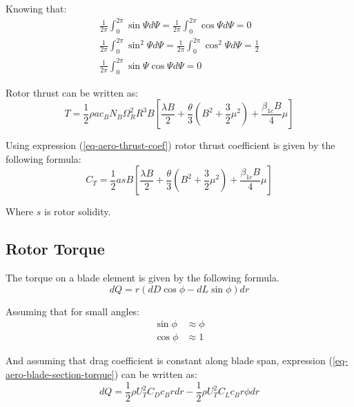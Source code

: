 Knowing that: \cite{GessowMyers1985}
\begin{gather}
  \frac{1}{2\pi} \int_{0}^{2\pi} \sin \Psi d\Psi =
  \frac{1}{2\pi} \int_{0}^{2\pi} \cos \Psi d\Psi = 0 \\
  \frac{1}{2\pi} \int_{0}^{2\pi} \sin^2 \Psi d\Psi =
  \frac{1}{2\pi} \int_{0}^{2\pi} \cos^2 \Psi d\Psi = \frac{1}{2} \\
  \frac{1}{2\pi} \int_{0}^{2\pi} \sin \Psi \cos \Psi d\Psi = 0
\end{gather}

Rotor thrust can be written as:
\begin{equation}
  T = \frac{1}{2} \rho a c_B N_B \Omega_R^2 R^3 B
  \left[
    \frac{\lambda B}{2} 
    +
    \frac{\theta}{3} \left( B^2 + \frac{3}{2} \mu^2 \right)
    +
    \frac{\beta_{1c} B}{4} \mu
  \right]
\end{equation}

Using expression (\ref{eq-aero-thrust-coef}) rotor thrust coefficient is given by the following formula:
\begin{equation}
  C_T = \frac{1}{2} a s B
  \left[
    \frac{\lambda B}{2}
    +
    \frac{\theta}{3} \left( B^2 + \frac{3}{2} \mu^2 \right)
    +
    \frac{\beta_{1c} B}{4} \mu
  \right]
\end{equation}

Where $s$ is rotor solidity.

\subsection{Rotor Torque}

The torque on a blade element is given by the following formula. \cite{GessowMyers1985, Bramwell2001}
\begin{equation}
  \label{eq-aero-blade-section-torque}
  dQ = r \left( dD \cos \phi - dL \sin \phi \right) dr
\end{equation}

Assuming that for small angles:
\begin{align}
  \sin \phi &\approx \phi \\
  \cos \phi &\approx 1
\end{align}

And assuming that drag coefficient is constant along blade span, expression (\ref{eq-aero-blade-section-torque}) can be written as: \cite{GessowMyers1985, Bramwell2001}
\begin{equation}
  dQ =
  \frac{1}{2} \rho U_T^2 C_D c_B r dr -
  \frac{1}{2} \rho U_T^2 C_L c_B r \phi dr
\end{equation}

